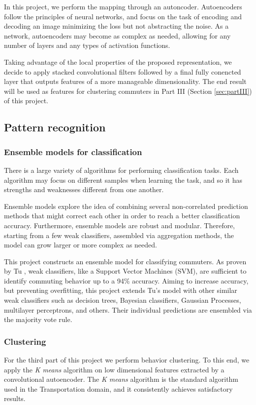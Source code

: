 \documentclass{article}
\begin{document}
In this project, we perform the mapping through an autoncoder. Autoencoders follow the principles of neural networks, and focus on the task of encoding and decoding an image minimizing the loss but not abstracting the noise. As a network, autoencoders may become as complex as needed, allowing for any number of layers and any types of activation functions. 

Taking advantage of the local properties of the proposed representation, we decide to apply stacked convolutional filters followed by a final fully conencted layer that outputs features of a more manageable dimensionality. The end result will be used as features for clustering commuters in Part III (Section \ref{sec:partIII}) of this project. 

\subsection{Pattern recognition}

\subsubsection{Ensemble models for classification}
There is a large variety of algorithms for performing classification tasks. Each algorithm may focus on different samples when learning the task, and so it has strengths and weaknesses different from one another. 

Ensemble models explore the idea of combining several non-correlated prediction methods that might correct each other in order to reach a better classification accuracy. Furthermore, ensemble models are robust and modular. Therefore, starting from a few weak classifiers, assembled via aggregation methods, the model can grow larger or more complex as needed.

This project constructs an ensemble model for classifying commuters. As proven by Tu \cite{tu2016impact}, weak classifiers, like a Support Vector Machines (SVM), are sufficient to identify commuting behavior up to a 94\% accuracy. Aiming to increase accuracy, but preventing overfitting, this project extends Tu's model with other similar weak classifiers such as decision trees, Bayesian classifiers, Gaussian Processes, multilayer perceptrons, and others. Their individual predictions are ensembled via the majority vote rule. 

\subsubsection{Clustering} 
For the third part of this project we perform behavior clustering. To this end, we apply the \textit{K means} algorithm on low dimensional features extracted by a convolutional autoencoder. The \textit{K means} algorithm is the standard algorithm used in the Transportation domain, and it consistently achieves satisfactory results. 
\end{document}
